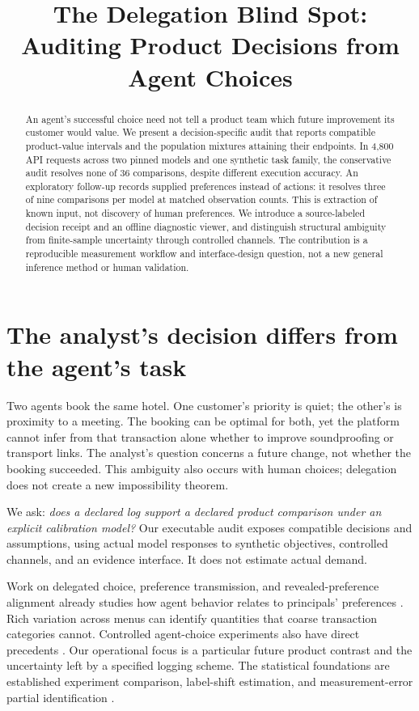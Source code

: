 \documentclass[manuscript,review,anonymous]{acmart}
\title{The Delegation Blind Spot: Auditing Product Decisions from Agent Choices}
\begin{document}
\begin{abstract}
An agent's successful choice need not tell a product team which future improvement its customer would value. We present a decision-specific audit that reports compatible product-value intervals and the population mixtures attaining their endpoints. In 4,800 API requests across two pinned models and one synthetic task family, the conservative audit resolves none of 36 comparisons, despite different execution accuracy. An exploratory follow-up records supplied preferences instead of actions: it resolves three of nine comparisons per model at matched observation counts. This is extraction of known input, not discovery of human preferences. We introduce a source-labeled decision receipt and an offline diagnostic viewer, and distinguish structural ambiguity from finite-sample uncertainty through controlled channels. The contribution is a reproducible measurement workflow and interface-design question, not a new general inference method or human validation.
\end{abstract}
\maketitle

\section{The analyst's decision differs from the agent's task}
Two agents book the same hotel. One customer's priority is quiet; the other's is proximity to a meeting. The booking can be optimal for both, yet the platform cannot infer from that transaction alone whether to improve soundproofing or transport links. The analyst's question concerns a future change, not whether the booking succeeded. This ambiguity also occurs with human choices; delegation does not create a new impossibility theorem.

We ask: \emph{does a declared log support a declared product comparison under an explicit calibration model?} Our executable audit exposes compatible decisions and assumptions, using actual model responses to synthetic objectives, controlled channels, and an evidence interface. It does not estimate actual demand.

Work on delegated choice, preference transmission, and revealed-preference alignment already studies how agent behavior relates to principals' preferences \cite{kops2026,kraft2026,suleymanov2026}. Rich variation across menus can identify quantities that coarse transaction categories cannot. Controlled agent-choice experiments also have direct precedents \cite{cherep2025}. Our operational focus is a particular future product contrast and the uncertainty left by a specified logging scheme. The statistical foundations are established experiment comparison, label-shift estimation, and measurement-error partial identification \cite{blackwell1953,lipton2018,finkelstein2021}.
\end{document}
